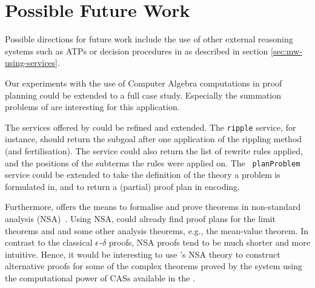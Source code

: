 \section{Possible Future Work} 
\label{sec:future}
Possible directions for future work include the use of other external
reasoning systems such as ATPs or decision procedures in {\lclam} as
described in section \ref{sec:mw-using-services}.

Our experiments with the use of Computer Algebra computations in proof
planning could be extended to a full case study. Especially the
summation problems of \cite{Walsh00} are interesting for this application.

The services offered by {\lclam} could be refined and extended. The
{\tt ripple} service, for instance, should return the subgoal after
one application of the rippling method (and fertilisation). The
service could also return the list of rewrite rules applied, and the
positions of the subterms the rules were applied on.  The {\tt
  planProblem} service could be extended to take the definition of the
theory a problem is formulated in, and to return a (partial) proof
plan in {\omdoc} encoding.

Furthermore, {\lclam} offers the means to formalise and prove theorems
in non-standard analysis (NSA)~\cite{Maclean02}. Using NSA, {\lclam}
could already find proof plans for the limit theorems {\limplus} and
{\limtimes} and some other analysis theorems, e.g., the mean-value
theorem. In contrast to the classical $\epsilon$-$\delta$ proofs, NSA
proofs tend to be much shorter and more intuitive.  Hence, it would be
interesting to use {\lclam}'s NSA theory to construct alternative
proofs for some of the complex theorems proved by the {\analytica}
system using the computational power of CASs available in the
{\mathwebsb}.

